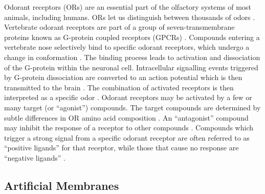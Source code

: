 \documentclass[
  a4paper,
]{scrbook}
\begin{document}
Odorant receptors (ORs) are an essential part of the olfactory systems
of most animals, including humans. ORs let us distinguish between
thousands of odors \autocite{Buck1991,Dung2018,Yang2018,Kim2022a}.
Vertebrate odorant receptors are part of a group of seven-transmembrane
proteins known as G-protein coupled receptors (GPCRs)
\autocite{Buck1991,Glatz2011,Dung2018,Wicher2021}. Compounds entering a
vertebrate nose selectively bind to specific odorant receptors, which
undergo a change in conformation \autocite{Dung2018,Kim2022a}. The
binding process leads to activation and dissociation of the G-protein
within the neuronal cell. Intracellular signalling events triggered by
G-protein dissociation are converted to an action potential which is
then transmitted to the brain \autocite{Buck1991,Glatz2011,Zhang2021}.
The combination of activated receptors is then interpreted as a specific
odor \autocite{Sato2014,Kwon2015,Hurot2020,Kim2022a}. Odorant receptors
may be activated by a few or many target (or ``agonist'') compounds. The
target compounds are determined by subtle differences in OR amino acid
composition \autocite{Carraher2015,Yang2018,Goodwin2021}. An
``antagonist'' compound may inhibit the response of a receptor to other
compounds \autocite{Lee2012,Carraher2015}. Compounds which trigger a
strong signal from a specific odorant receptor are often referred to as
``positive ligands'' for that receptor, while those that cause no
response are ``negative ligands''
\autocite{Murugathas2019a,Murugathas2020,Yoo2022}.

\hypertarget{sec-artificial-membranes}{%
\subsection{Artificial Membranes}\label{sec-artificial-membranes}}
\end{document}

